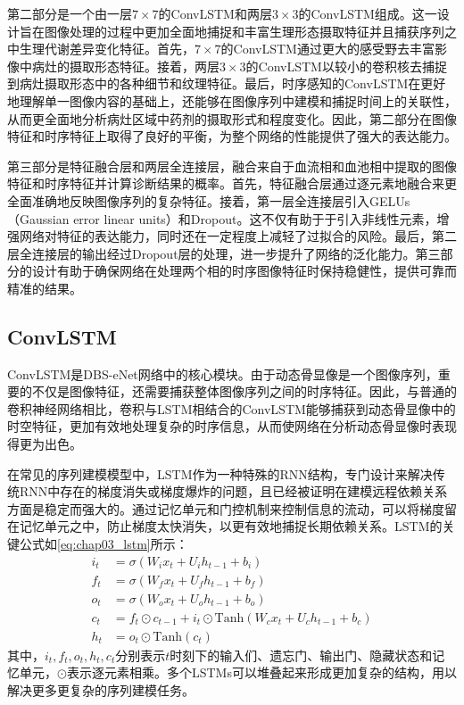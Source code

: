 第二部分是一个由一层\(7 \times 7\)的ConvLSTM和两层\(3 \times 3\)的ConvLSTM组成。这一设计旨在图像处理的过程中更加全面地捕捉和丰富生理形态摄取特征并且捕获序列之中生理代谢差异变化特征。首先，\(7 \times 7\)的ConvLSTM通过更大的感受野去丰富影像中病灶的摄取形态特征。接着，两层\(3 \times 3\)的ConvLSTM以较小的卷积核去捕捉到病灶摄取形态中的各种细节和纹理特征。最后，时序感知的ConvLSTM在更好地理解单一图像内容的基础上，还能够在图像序列中建模和捕捉时间上的关联性，从而更全面地分析病灶区域中药剂的摄取形式和程度变化。因此，第二部分在图像特征和时序特征上取得了良好的平衡，为整个网络的性能提供了强大的表达能力。

第三部分是特征融合层和两层全连接层，融合来自于血流相和血池相中提取的图像特征和时序特征并计算诊断结果的概率。首先，特征融合层通过逐元素地融合来更全面准确地反映图像序列的复杂特征。接着，第一层全连接层引入GELUs（Gaussian error linear units）和Dropout\cite{srivastava2014dropout}。这不仅有助于于引入非线性元素，增强网络对特征的表达能力，同时还在一定程度上减轻了过拟合的风险。最后，第二层全连接层的输出经过Dropout层的处理，进一步提升了网络的泛化能力。第三部分的设计有助于确保网络在处理两个相的时序图像特征时保持稳健性，提供可靠而精准的结果。

\subsection{{\tm ConvLSTM}}

ConvLSTM是DBS-eNet网络中的核心模块。由于动态骨显像是一个图像序列，重要的不仅是图像特征，还需要捕获整体图像序列之间的时序特征。因此，与普通的卷积神经网络相比，卷积与LSTM相结合的ConvLSTM能够捕获到动态骨显像中的时空特征，更加有效地处理复杂的时序信息，从而使网络在分析动态骨显像时表现得更为出色。

在常见的序列建模模型中，LSTM\cite{memory2010long}作为一种特殊的RNN结构，专门设计来解决传统RNN中存在的梯度消失或梯度爆炸的问题，且已经被证明在建模远程依赖关系方面是稳定而强大的。通过记忆单元和门控机制来控制信息的流动，可以将梯度留在记忆单元之中，防止梯度太快消失，以更有效地捕捉长期依赖关系。LSTM的关键公式如\ref{eq:chap03_lstm}所示：
\begin{equation}
  \begin{aligned}
    i_t & = \sigma(W_i x_t + U_i h_{t-1} + b_i)                                    \\
    f_t & = \sigma(W_f x_t + U_f h_{t-1} + b_f)                                    \\
    o_t & = \sigma(W_o x_t + U_o h_{t-1} + b_o)                                    \\
    c_t & = f_t \odot c_{t-1} + i_t \odot \text{Tanh}(W_c x_t + U_c h_{t-1} + b_c) \\
    h_t & = o_t \odot \text{Tanh}(c_t)
  \end{aligned}
  \label{eq:chap03_lstm}
\end{equation}
其中，\(i_t,f_t,o_t,h_t,c_t\)分别表示\(t\)时刻下的输入们、遗忘门、输出门、隐藏状态和记忆单元，\(\odot\)表示逐元素相乘。多个LSTMs可以堆叠起来形成更加复杂的结构，用以解决更多更复杂的序列建模任务。

